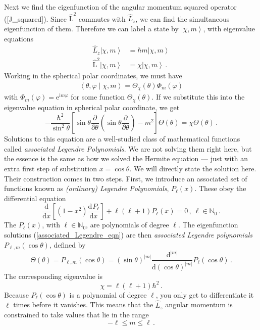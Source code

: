 \documentclass{article}
\theoremstyle{plain}\theoremheaderfont{\normalfont\itshape}\theorembodyfont{\rmfamily}\theoremseparator{.}\newtheorem*{rem}{Remark}\newtheorem*{ex}{Example}\newtheorem*{proof}{Proof}\newtheorem*{altp}{Alternative proof}
\theoremstyle{plain}\theoremheaderfont{\normalfont\bfseries}\theorembodyfont{\rmfamily}\theoremseparator{.}\newtheorem{thm}{Theorem}[section]\newtheorem{lem}[thm]{Lemma}\newtheorem{prop}[thm]{Proposition}\newtheorem*{cor}{Corollary}\newtheorem{defn}[thm]{Definition}\newtheorem{clm}[thm]{Claim}\newtheorem{clminproof}{Claim}
\theoremstyle{break}\theoremheaderfont{\normalfont\itshape}\theorembodyfont{\rmfamily}\theoremseparator{.\medskip}\newtheorem*{proofskip}{Proof}\newtheorem*{exs}{Examples}\newtheorem*{rems}{Remarks}
\theoremstyle{break}\theoremheaderfont{\normalfont\bfseries}\theorembodyfont{\rmfamily}\theoremseparator{.\medskip}\newtheorem{lemskip}[thm]{Lemma}\newtheorem{defnskip}[thm]{Definition}\newtheorem{propskip}[thm]{Proposition}\newtheorem{thmskip}[thm]{Theorem}
\numberwithin{equation}{section}
\newcommand{\ii}{\mathrm{i}}
\newcommand{\ee}{\mathrm{e}}
\newcommand{\dv}[3][]{\frac{\mathrm{d}^{#1} #2}{{\mathrm{d} #3}^{#1}}}
\newcommand{\pdv}[3][]{\frac{\partial^{#1} #2}{{\partial #3}^{#1}}}
\newcommand{\ket}[1]{\left| #1 \right\rangle}
\newcommand{\braket}[2]{\left\langle #1 \middle| #2 \right\rangle}
\newcommand{\vb}[1]{\bm{\mathrm{#1}}}
\newcommand{\abs}[1]{\left| #1 \right|}
\begin{document}
    Next we find the eigenfunction of the angular momentum squared operator (\ref{J_squared}). Since \(\hat{\vb{L}}^2\) commutes with \(\hat{L}_z\), we can find the simultaneous eigenfunction of them. Therefore we can label a state by \(\ket{\chi,m}\), with eigenvalue equations
    \begin{align}
        \hat{L}_z\ket{\chi,m}&=\hbar m\ket{\chi,m}\\
        \hat{\vb{L}}^2\ket{\chi,m}&=\chi\ket{\chi,m}\,.
    \end{align}
    Working in the spherical polar coordinates, we must have
    \begin{align}
        \braket{\theta,\varphi}{\chi,m}=\Theta_{\chi}(\theta)\Phi_m(\varphi)
    \end{align}
    with \(\Phi_m(\varphi)=\ee^{\ii m\varphi}\) for some function \(\Theta_{\chi}(\theta)\).
    If we substitute this into the eigenvalue equation in spherical polar coordinate, we get
    \begin{equation}\label{associated_Legendre_eqn}
        -\frac{\hbar^2}{\sin^2\theta}\left[\sin\theta\pdv{}{\theta}\left(\sin\theta\pdv{}{\theta}\right)-m^2\right]\Theta(\theta)=\chi \Theta(\theta)\,.
    \end{equation}
    Solutions to this equation are a well-studied class of mathematical functions called \textit{associated Legendre Polynomials}. We are not solving them right here, but the essence is the same as how we solved the Hermite equation --- just with an extra first step of substitution \(x=\cos\theta\). We will directly state the solution here. Their construction comes in two steps. First, we introduce an associated set of functions known as \textit{(ordinary) Legendre Polynomials}, \(P_\ell(x)\). These obey the differential equation
    \begin{equation}
        \dv{}{x}\left[(1-x^2)\dv{P_\ell}{x}\right]+\ell(\ell+1)P_\ell(x)=0\,,\ \ell\in\mathbb{N}_0\,.
    \end{equation}
    The \(P_\ell(x)\), with \(\ell\in\mathbb{N}_0\), are polynomials of degree \(\ell\). The eigenfunction solutions (\ref{associated_Legendre_eqn}) are then \textit{associated Legendre polynomials} \(P_{\ell,m}(\cos\theta)\), defined by
    \begin{equation}
        \Theta(\theta)=P_{\ell,m}(\cos\theta)=(\sin\theta)^{\abs{m}}\dv[\abs{m}]{}{(\cos\theta)}P_\ell(\cos\theta)\,.
    \end{equation}
    The corresponding eigenvalue is
    \begin{equation}
        \chi=\ell(\ell+1)\hbar^2\,.
    \end{equation}
    Because \(P_\ell(\cos\theta)\) is a polynomial of degree \(\ell\), you only get to differentiate it \(\ell\) times before it vanishes. This means that the \(\hat{L}_z\) angular momentum is constrained to take values that lie in the range
    \begin{equation}
        -\ell\le m\le \ell\,.
    \end{equation}
\end{document}
